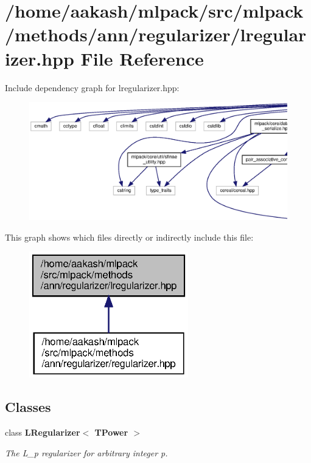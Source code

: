 \section{/home/aakash/mlpack/src/mlpack/methods/ann/regularizer/lregularizer.hpp File Reference}
\label{lregularizer_8hpp}
Include dependency graph for lregularizer.\+hpp\+:
\nopagebreak
\begin{figure}[H]
\begin{center}
\leavevmode
\includegraphics[width=350pt]{lregularizer_8hpp__incl}
\end{center}
\end{figure}
This graph shows which files directly or indirectly include this file\+:
\nopagebreak
\begin{figure}[H]
\begin{center}
\leavevmode
\includegraphics[width=196pt]{lregularizer_8hpp__dep__incl}
\end{center}
\end{figure}
\subsection*{Classes}
\begin{DoxyCompactItemize}
\item 
class \textbf{ L\+Regularizer$<$ T\+Power $>$}
\begin{DoxyCompactList}\small\item\em The L\+\_\+p regularizer for arbitrary integer p. \end{DoxyCompactList}\end{DoxyCompactItemize}
